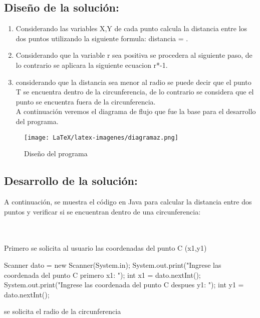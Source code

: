 \subsection{\textbf{Diseño de la solución:}}
\begin{enumerate}[label=\textbf{\arabic*.}]

  \item Considerando las variables X,Y de cada punto calcula la distancia entre los dos puntos utilizando la siguiente formula: {distancia} = .

  \item  Considerando que la variable r sea positiva se procedera al siguiente paso, de lo contrario se aplicara la siguiente ecuacion r*-1.
  \item considerando que la distancia sea menor al radio se puede decir que el punto T se encuentra dentro de la circunferencia, de lo contrario se considera que el punto se encuentra fuera de la circunferencia. 
  \\
  A continuación veremos el diagrama de flujo que fue la base para el desarrollo del programa.
\end{enumerate}
\begin{figure}[H]
    \centering
    \texttt{[image: LaTeX/latex-imagenes/diagramaz.png]}
    \caption{Diseño del programa}
    \label{fig:imagen7}
\end{figure}


\subsection{\textbf{Desarrollo de la solución:}}
A continuación, se muestra el código en Java para calcular la distancia entre dos puntos y verificar si se encuentran dentro de una circunferencia:


  \\
  \\
  
        Primero se solicita al usuario las coordenadas del punto C (x1,y1)
       \begin{javaCode}
        Scanner dato = new Scanner(System.in);
        System.out.print("Ingrese las coordenada del punto C primero x1: ");
        int x1 = dato.nextInt();
        System.out.print("Ingrese las coordenada del punto C despues  y1: ");
        int y1 = dato.nextInt();
         \end{javaCode}
         se solicita el radio de la circunferencia
       
